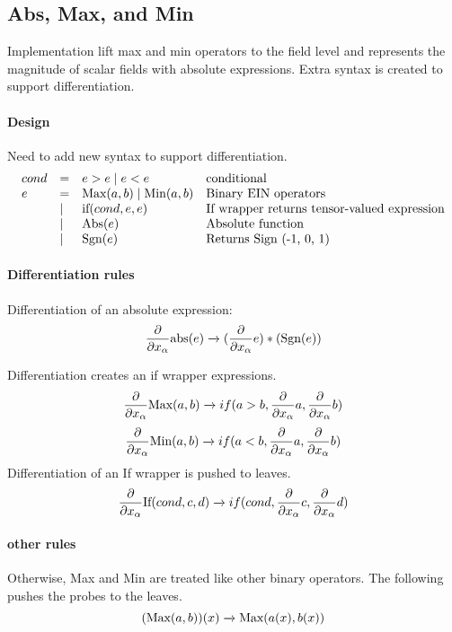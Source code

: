 \subsection{Abs, Max, and Min}


Implementation lift max  and min operators to the field level and represents the magnitude of scalar fields with absolute expressions. 
Extra syntax is created to support differentiation.


\paragraph{Design}
Need to add new syntax to support differentiation.
$$\begin{array}{llll}
cond &=& e>e \mid e<e & \text{conditional }\\
e&=&  \text{Max}(a,b)  \mid \text{Min}(a,b) & \text{Binary EIN{} operators}\\
&\mid & \text{if}(cond, e, e)  &\text{If wrapper returns tensor-valued expression}\\
&\mid &\text{Abs}(e) &\text{Absolute function}\\
&\mid &\text{Sgn} (e)& \text{Returns Sign (-1, 0, 1)}\\
\end{array}$$

 \paragraph{Differentiation rules}
 Differentiation of an absolute expression:
  $$\frac{\partial}{\partial x_\alpha} \text{abs}(e) \xrightarrow[]{}
( \frac{\partial}{\partial x_\alpha} e) *(\text{Sgn} (e))
 $$ 

Differentiation creates an if wrapper expressions.
 $$\frac{\partial}{\partial x_\alpha} \text{Max}(a,b) \xrightarrow[]{} if(a>b, \frac{\partial}{\partial x_\alpha}a, \frac{\partial}{\partial x_\alpha}b)  $$
 $$\frac{\partial}{\partial x_\alpha}\text{Min}(a,b) \xrightarrow[]{} if(a<b, \frac{\partial}{\partial x_\alpha}  a, \frac{\partial}{\partial x_\alpha} b)  $$
  Differentiation of an If wrapper is pushed to leaves.
   $$\frac{\partial}{\partial x_\alpha} \text{If}(cond, c,d) \xrightarrow[]{} if(cond, \frac{\partial}{\partial x_\alpha}c, \frac{\partial}{\partial x_\alpha}d)  $$
  \paragraph{other  rules}
Otherwise, Max and Min are treated like  other binary operators. The following pushes the probes to the leaves.
  $$ (\text{Max}(a,b))(x) \xrightarrow[]{} \text{Max}(a(x),  b(x)) $$

